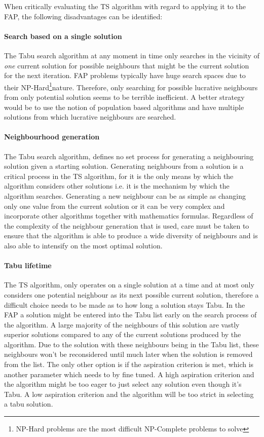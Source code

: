 When critically evaluating the TS algorithm with regard to applying it to the FAP, the following disadvantages can be identified:
\paragraph{Search based on a single solution}
The Tabu search algorithm at any moment in time only searches in the vicinity of \emph{one} current solution for possible neighbours that might be the current solution for the next iteration. FAP problems typically have huge search spaces due to their NP-Hard\footnote{NP-Hard problems are the most difficult NP-Complete problems to solve\cite{AIModernApproach}}nature. Therefore, only searching for possible lucrative neighbours from only potential solution seems to be terrible inefficient. A better strategy would be to use the notion of population based algorithms and have multiple solutions from which lucrative neighbours are searched.
\paragraph{Neighbourhood generation}
The Tabu search algorithm, defines no set process for generating a neighbouring solution given a starting solution. Generating neighbours from a solution is a critical process in the TS algorithm, for it is the only means by which the algorithm considers other solutions i.e. it is the mechanism by which the algorithm searches. Generating a new neighbour can be as simple as changing only one value from the current solution or it can be very complex and incorporate other algorithms together with mathematics formulas. Regardless of the complexity of the neighbour generation that is used, care must be taken to ensure that the algorithm is able to produce a wide diversity of neighbours and is also able to intensify on the most optimal solution.
\paragraph{Tabu lifetime}
The TS algorithm, only operates on a single solution at a time and at most only considers one potential neighbour as its next possible current solution, therefore a difficult choice needs to be made as to how long a solution stays Tabu. In the FAP a solution might be entered into the Tabu list early on the search process of the algorithm. A large majority of the neighbours of this solution are vastly superior solutions compared to any of the current solutions produced by the algorithm. Due to the solution with these neighbours being in the Tabu list, these neighbours won't be reconsidered until much later when the solution is removed from the list. The only other option is if the aspiration criterion is met, which is another parameter which needs to by fine tuned. A high aspiration criterion and the algorithm might be too eager to just select any solution even though it's Tabu. A low aspiration criterion and the algorithm will be too strict in selecting a tabu solution.

